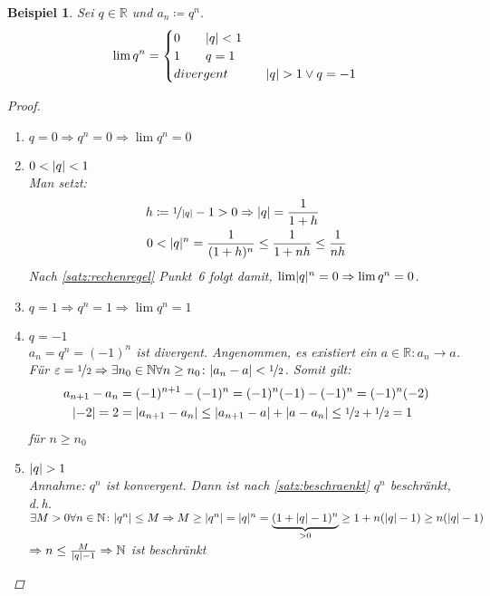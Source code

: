 \documentclass[ngerman,titlepage,twoside, parskip=half*]{scrreprt}
\newcommand*{\N}{\mathbb{N}}
\newcommand*{\R}{\mathbb{R}}
\theoremstyle{break}
\theoremstyle{nonumberbreak}
\newtheorem{beispiel}{Beispiel}
\newtheorem{proof}{Beweis:}
\DeclarePairedDelimiter{\abs}{\lvert}{\rvert}
\begin{document}
\begin{beispiel}
  Sei $q \in \R$ und $a_n \coloneqq q^n$.
  \begin{gather*}\lim q^n =
  \begin{cases}
    0 \qquad \abs{q} < 1\\
    1 \qquad q = 1\\
    divergent \qquad & \abs{q}>1 \vee q=-1
  \end{cases}\end{gather*}
\begin{proof}
  \begin{enumerate}[1.~F{a}ll]
  \item $q=0 \Rightarrow q^n=0 \Rightarrow \lim q^n=0$
  \item $0<\abs{q}<1$\\
    Man setzt:
    \begin{align*}
      h &\coloneqq \nicefrac{1}{\abs{q}}-1>0\Rightarrow \abs{q} =
      \frac{1}{1+h}\\
      0 &<\abs{q}^n = \frac{1}{(1+h)^n} \leq \frac{1}{1+nh} \leq
      \frac{1}{nh}
    \end{align*}
    Nach \autoref{satz:rechenregel} Punkt~6 folgt damit, $\lim \abs{q}^n=0
    \Rightarrow \lim q^n=0$.
  \item $q=1 \Rightarrow q^n =1 \Rightarrow \lim q^n=1$
  \item $q=-1$\\
    $a_n=q^n=(-1)^n$ ist divergent. Angenommen, es existiert ein $a
    \in \R \colon a_n \rightarrow a$. Für $\varepsilon=\nicefrac{1}{2}
    \Rightarrow \exists n_0 \in \N \forall n \geq n_0 \colon
    \abs{a_n-a}<\nicefrac{1}{2}$. Somit gilt:
    \begin{align*}
      a_{n+1}-a_n& = (-1)^{n+1}-(-1)^n = (-1)^n(-1)-(-1)^n =
      (-1)^n(-2)\\ \
      \abs{-2}=2 &= \abs{a_{n+1}-a_n} \leq \abs{a_{n+1}-a} + \abs{a-a_n} \leq
      \nicefrac{1}{2} +\nicefrac{1}{2}=1
    \end{align*}
    für $n \geq n_0$ \lightning
  \item $\abs{q}>1$\\
    Annahme: $q^n$ ist konvergent. Dann ist nach
    \autoref{satz:beschraenkt} $q^n$ beschränkt, d.\,h. $\exists M >
    0 \forall n \in \N \colon \abs{q^n} \leq M \Rightarrow M \geq
    \abs{q^n} = \abs{q}^n
    =\underbrace{(1+\abs{q}-1)^n}_{>0} \geq 1+n(\abs{q}-1) \geq n(\abs{q}-1)$\\
    $\Rightarrow n \leq \frac{M}{\abs{q}-1} \Rightarrow \N$ ist beschränkt
    \lightning
\end{enumerate}
\end{proof}
\end{beispiel}
\end{document}
